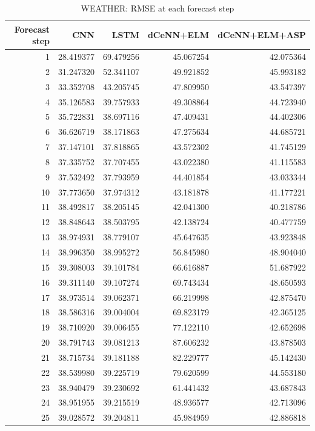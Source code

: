 \begin{table}
\caption{WEATHER: RMSE at each forecast step}
\begin{tabular}{rrrrr}
\toprule
Forecast step & CNN & LSTM & dCeNN+ELM & dCeNN+ELM+ASP \\
\midrule
1 & 28.419377 & 69.479256 & 45.067254 & 42.075364 \\
2 & 31.247320 & 52.341107 & 49.921852 & 45.993182 \\
3 & 33.352708 & 43.205745 & 47.809950 & 43.547397 \\
4 & 35.126583 & 39.757933 & 49.308864 & 44.723940 \\
5 & 35.722831 & 38.697116 & 47.409431 & 44.402306 \\
6 & 36.626719 & 38.171863 & 47.275634 & 44.685721 \\
7 & 37.147101 & 37.818865 & 43.572302 & 41.745129 \\
8 & 37.335752 & 37.707455 & 43.022380 & 41.115583 \\
9 & 37.532492 & 37.793959 & 44.401854 & 43.033344 \\
10 & 37.773650 & 37.974312 & 43.181878 & 41.177221 \\
11 & 38.492817 & 38.205145 & 42.041300 & 40.218786 \\
12 & 38.848643 & 38.503795 & 42.138724 & 40.477759 \\
13 & 38.974931 & 38.779107 & 45.647635 & 43.923848 \\
14 & 38.996350 & 38.995272 & 56.845980 & 48.904040 \\
15 & 39.308003 & 39.101784 & 66.616887 & 51.687922 \\
16 & 39.311140 & 39.107274 & 69.743434 & 48.650593 \\
17 & 38.973514 & 39.062371 & 66.219998 & 42.875470 \\
18 & 38.586316 & 39.004004 & 69.823179 & 42.365125 \\
19 & 38.710920 & 39.006455 & 77.122110 & 42.652698 \\
20 & 38.791743 & 39.081213 & 87.606232 & 43.878503 \\
21 & 38.715734 & 39.181188 & 82.229777 & 45.142430 \\
22 & 38.539980 & 39.225719 & 79.620599 & 44.553180 \\
23 & 38.940479 & 39.230692 & 61.441432 & 43.687843 \\
24 & 38.951955 & 39.215519 & 48.936577 & 42.713096 \\
25 & 39.028572 & 39.204811 & 45.984959 & 42.886818 \\

\end{tabular}
\end{table}
